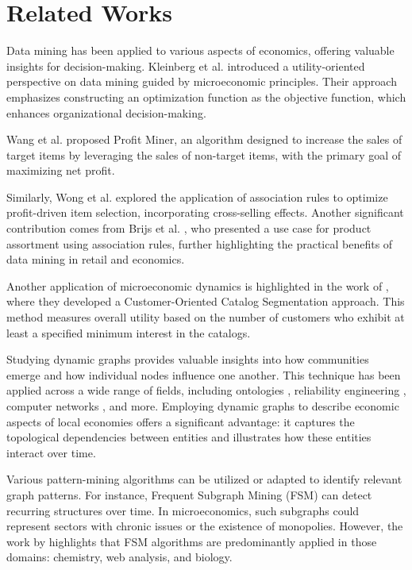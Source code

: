 \documentclass[12pt]{article}
\begin{document}
\section{Related Works}
Data mining has been applied to various aspects of economics, offering valuable insights for decision-making. Kleinberg et al. \cite{kleinberg1998microeconomic} introduced a utility-oriented perspective on data mining guided by microeconomic principles. Their approach emphasizes constructing an optimization function as the objective function, which enhances organizational decision-making.

Wang et al. \cite{wang2002profit} proposed Profit Miner, an algorithm designed to increase the sales of target items by leveraging the sales of non-target items, with the primary goal of maximizing net profit.

Similarly, Wong et al. \cite{wong2003mpis} explored the application of association rules to optimize profit-driven item selection, incorporating cross-selling effects. Another significant contribution comes from Brijs et al. \cite{brijs1999using}, who presented a use case for product assortment using association rules, further highlighting the practical benefits of data mining in retail and economics.

Another application of microeconomic dynamics is highlighted in the work of \cite{martin4microeconomic}, where they developed a Customer-Oriented Catalog Segmentation approach. This method measures overall utility based on the number of customers who exhibit at least a specified minimum interest in the catalogs.

Studying dynamic graphs provides valuable insights into how communities emerge and how individual nodes influence one another. This technique has been applied across a wide range of fields, including ontologies \cite{burch2015visualizing}, reliability engineering \cite{zhao2018dynamic}, computer networks \cite{meng2018network}, and more. Employing dynamic graphs to describe economic aspects of local economies offers a significant advantage: it captures the topological dependencies between entities and illustrates how these entities interact over time.

Various pattern-mining algorithms can be utilized or adapted to identify relevant graph patterns. For instance, Frequent Subgraph Mining (FSM) \cite{jiang2013survey} can detect recurring structures over time. In microeconomics, such subgraphs could represent sectors with chronic issues or the existence of monopolies. However, the work by \cite{jiang2013survey} highlights that FSM algorithms are predominantly applied in those domains: chemistry, web analysis, and biology.
\end{document}
